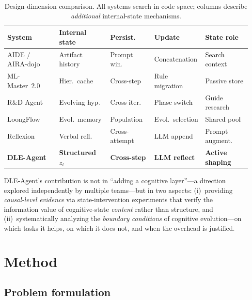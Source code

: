 \documentclass{article} %
\begin{document}
\begin{table}[t]
\centering
\caption{Design-dimension comparison. All systems search in code space;
columns describe \emph{additional} internal-state mechanisms.}
\label{tab:comparison}
\footnotesize
\renewcommand{\arraystretch}{1.15}
\begin{tabular}{@{}l@{\hskip 6pt}l@{\hskip 6pt}l@{\hskip 6pt}l@{\hskip 6pt}l@{}}
\toprule
\textbf{System}
  & \textbf{Internal state}
  & \textbf{Persist.}
  & \textbf{Update}
  & \textbf{State role} \\
\midrule
AIDE / AIRA-dojo
  & Artifact history
  & Prompt win.
  & Concatenation
  & Search context \\
ML-Master~2.0
  & Hier.\ cache
  & Cross-step
  & Rule migration
  & Passive store \\
R\&D-Agent
  & Evolving hyp.
  & Cross-iter.
  & Phase switch
  & Guide research \\
LoongFlow
  & Evol.\ memory
  & Population
  & Evol.\ selection
  & Shared pool \\
Reflexion
  & Verbal refl.
  & Cross-attempt
  & LLM append
  & Prompt augment. \\
\midrule
\textbf{DLE-Agent}
  & \textbf{Structured $z_t$}
  & \textbf{Cross-step}
  & \textbf{LLM reflect}
  & \textbf{Active shaping} \\
\bottomrule
\end{tabular}
\end{table}

DLE-Agent's contribution is not in ``adding a cognitive layer''---a direction
explored independently by multiple teams---but in two aspects: (i)~providing
\emph{causal-level evidence} via state-intervention experiments that verify
the information value of cognitive-state \emph{content} rather than structure,
and (ii)~systematically analyzing the \emph{boundary conditions} of cognitive
evolution---on which tasks it helps, on which it does not, and when the
overhead is justified.


\section{Method}
\label{sec:method}

\subsection{Problem formulation}
\label{sec:formulation}
\end{document}
